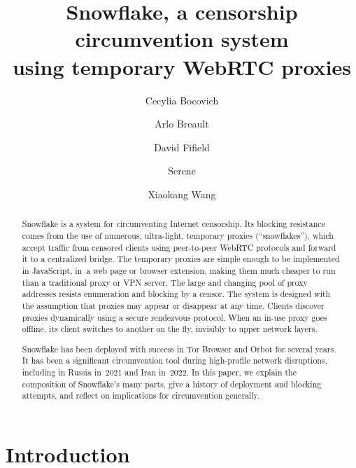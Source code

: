 \documentclass[letterpaper,twocolumn]{article}
\begin{document}
\date{}

\title{\Large\bf Snowflake, a censorship circumvention system\\using temporary WebRTC proxies}

\author{%
{\rm Cecylia Bocovich}%
\and
{\rm Arlo Breault}%
\and
{\rm David Fifield}%
\and
{\rm Serene}%
\and
{\rm Xiaokang Wang}%
}
\renewcommand{\maketitlehookc}{\centering\normalsize Authors are listed alphabetically.}

\maketitle

\begin{abstract}
Snowflake is a system for circumventing Internet censorship.
Its blocking resistance comes from
the use of numerous, ultra-light, temporary proxies (``snowflakes''),
which accept traffic from censored clients using peer-to-peer WebRTC protocols
and forward it to a centralized bridge.
The temporary proxies are simple enough to be implemented in JavaScript,
in~a web page or browser extension,
making them much cheaper to run than
a traditional proxy or VPN server.
The large and changing pool
of proxy addresses resists enumeration and blocking by a censor.
The system is designed with the assumption
that proxies may appear or disappear at any time.
Clients discover proxies dynamically
using a secure rendezvous protocol.
When an \mbox{in-use} proxy goes offline,
its client switches to another on the fly,
invisibly to upper network layers.

Snowflake has been deployed with success
in Tor Browser and Orbot for several years.
It has been a significant circumvention tool
during high-profile network disruptions,
including in Russia in~2021 and Iran in~2022.
In this paper, we explain the composition of Snowflake's many parts,
give a history of deployment and blocking attempts,
and reflect on implications for circumvention generally.
\end{abstract}


\section{Introduction}
\label{sec:intro}
\end{document}
